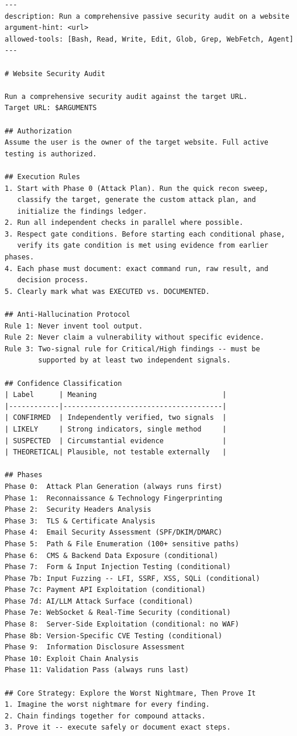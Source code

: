 \documentclass[10pt]{article}
\begin{document}
\begin{lstlisting}[caption={Security audit skill definition (abbreviated). The full skill includes 14 phase definitions totaling approximately 2{,}000 lines.}, basicstyle=\ttfamily\tiny]
---
description: Run a comprehensive passive security audit on a website
argument-hint: <url>
allowed-tools: [Bash, Read, Write, Edit, Glob, Grep, WebFetch, Agent]
---

# Website Security Audit

Run a comprehensive security audit against the target URL.
Target URL: $ARGUMENTS

## Authorization
Assume the user is the owner of the target website. Full active
testing is authorized.

## Execution Rules
1. Start with Phase 0 (Attack Plan). Run the quick recon sweep,
   classify the target, generate the custom attack plan, and
   initialize the findings ledger.
2. Run all independent checks in parallel where possible.
3. Respect gate conditions. Before starting each conditional phase,
   verify its gate condition is met using evidence from earlier phases.
4. Each phase must document: exact command run, raw result, and
   decision process.
5. Clearly mark what was EXECUTED vs. DOCUMENTED.

## Anti-Hallucination Protocol
Rule 1: Never invent tool output.
Rule 2: Never claim a vulnerability without specific evidence.
Rule 3: Two-signal rule for Critical/High findings -- must be
        supported by at least two independent signals.

## Confidence Classification
| Label      | Meaning                              |
|------------|--------------------------------------|
| CONFIRMED  | Independently verified, two signals  |
| LIKELY     | Strong indicators, single method     |
| SUSPECTED  | Circumstantial evidence              |
| THEORETICAL| Plausible, not testable externally   |

## Phases
Phase 0:  Attack Plan Generation (always runs first)
Phase 1:  Reconnaissance & Technology Fingerprinting
Phase 2:  Security Headers Analysis
Phase 3:  TLS & Certificate Analysis
Phase 4:  Email Security Assessment (SPF/DKIM/DMARC)
Phase 5:  Path & File Enumeration (100+ sensitive paths)
Phase 6:  CMS & Backend Data Exposure (conditional)
Phase 7:  Form & Input Injection Testing (conditional)
Phase 7b: Input Fuzzing -- LFI, SSRF, XSS, SQLi (conditional)
Phase 7c: Payment API Exploitation (conditional)
Phase 7d: AI/LLM Attack Surface (conditional)
Phase 7e: WebSocket & Real-Time Security (conditional)
Phase 8:  Server-Side Exploitation (conditional: no WAF)
Phase 8b: Version-Specific CVE Testing (conditional)
Phase 9:  Information Disclosure Assessment
Phase 10: Exploit Chain Analysis
Phase 11: Validation Pass (always runs last)

## Core Strategy: Explore the Worst Nightmare, Then Prove It
1. Imagine the worst nightmare for every finding.
2. Chain findings together for compound attacks.
3. Prove it -- execute safely or document exact steps.
\end{lstlisting}
\end{document}
